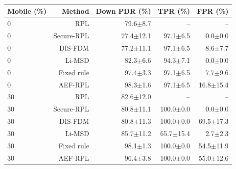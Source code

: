 \begin{tabular}{@{}lrrrr@{}}
\toprule
Mobile (\%) & Method & Down PDR (\%) & TPR (\%) & FPR (\%) \\
\midrule
0 & RPL & 79.6$\pm$8.7 & -- & -- \\
0 & Secure-RPL & 77.4$\pm$12.1 & 97.1$\pm$6.5 & 0.0$\pm$0.0 \\
0 & DIS-FDM & 77.2$\pm$11.1 & 97.1$\pm$6.5 & 8.6$\pm$7.7 \\
0 & Li-MSD & 82.3$\pm$6.6 & 94.3$\pm$7.1 & 0.0$\pm$0.0 \\
0 & Fixed rule & 97.4$\pm$3.3 & 97.1$\pm$6.5 & 7.7$\pm$9.6 \\
0 & AEF-RPL & 98.3$\pm$1.6 & 97.1$\pm$6.5 & 16.8$\pm$15.4 \\
30 & RPL & 82.6$\pm$12.0 & -- & -- \\
30 & Secure-RPL & 80.8$\pm$11.1 & 100.0$\pm$0.0 & 0.0$\pm$0.0 \\
30 & DIS-FDM & 80.8$\pm$11.3 & 100.0$\pm$0.0 & 69.5$\pm$17.3 \\
30 & Li-MSD & 85.7$\pm$11.2 & 65.7$\pm$15.4 & 2.7$\pm$2.3 \\
30 & Fixed rule & 98.1$\pm$1.3 & 100.0$\pm$0.0 & 54.5$\pm$11.9 \\
30 & AEF-RPL & 96.4$\pm$3.8 & 100.0$\pm$0.0 & 55.0$\pm$12.6 \\
\bottomrule
\end{tabular}
